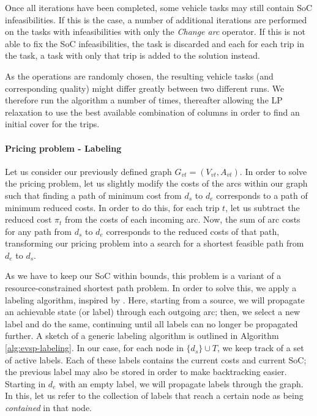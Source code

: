 \documentclass[]{article}
\begin{document}
\noindent Once all iterations have been completed, some vehicle tasks may still contain SoC infeasibilities. If this is the case, a number of additional iterations are performed on the tasks with infeasibilities with only the \textit{Change arc} operator. If this is not able to fix the SoC infeasibilities, the task is discarded and each for each trip in the task, a task with only that trip is added to the solution instead.

As the operations are randomly chosen, the resulting vehicle tasks (and corresponding quality) might differ greatly between two different runs. We therefore run the algorithm a number of times, thereafter allowing the LP relaxation to use the best available combination of columns in order to find an initial cover for the trips. 

\paragraph{Pricing problem - Labeling} \label{sec:labeling-evsp}
Let us consider our previously defined graph $G_{vt} = (V_{vt}, A_{vt})$. In order to solve the pricing problem, let us slightly modify the costs of the arcs within our graph such that finding a path of minimum cost from $d_s$ to $d_e$ corresponds to a path of minimum reduced costs. In order to do this, for each trip $t$, let us subtract the reduced cost $\pi_t$ from the costs of each incoming arc. Now, the sum of arc costs for any path from $d_s$ to $d_e$ corresponds to the reduced costs of that path, transforming our pricing problem into a search for a shortest feasible path from $d_e$ to $d_s$.

As we have to keep our SoC within bounds, this problem is a variant of a resource-constrained shortest path problem. In order to solve this, we apply a labeling algorithm, inspired by \citet{Huang2016}. Here, starting from a source, we will propagate an achievable state (or label) through each outgoing arc; then, we select a new label and do the same, continuing until all labels can no longer be propagated further. A sketch of a generic labeling algorithm is outlined in Algorithm \ref{alg:evsp-labeling}. In our case, for each node in $\{ d_s \} \cup T$, we keep track of a set of active labels. Each of these labels contains the current costs and current SoC; the previous label may also be stored in order to make backtracking easier. Starting in $d_e$ with an empty label, we will propagate labels through the graph. In this, let us refer to the collection of labels that reach a certain node as being \textit{contained} in that node. 
\end{document}
